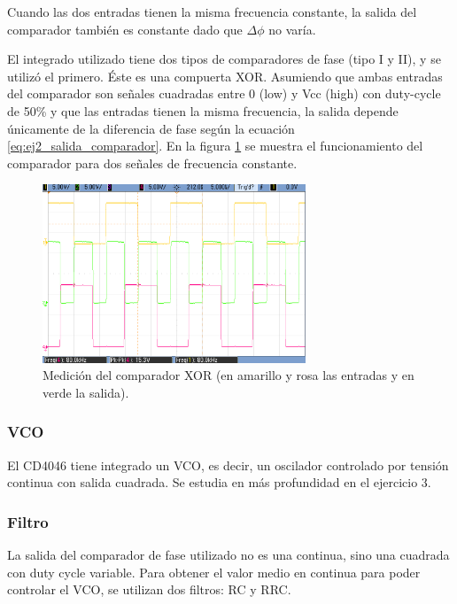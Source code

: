 \documentclass[../../tc_tp6_main.tex]{subfiles}
\begin{document}
Cuando las dos entradas tienen la misma frecuencia constante, la salida del comparador tambi\'en es constante dado que $\Delta \phi$ no var\'ia. 

El integrado utilizado tiene dos tipos de comparadores de fase (tipo I y II), y se utiliz\'o el primero. \'Este es una compuerta XOR. Asumiendo que ambas entradas del comparador son se\~nales cuadradas entre 0 (low) y Vcc (high) con duty-cycle de 50\% y que las entradas tienen la misma frecuencia, la salida depende \'unicamente de la diferencia de fase seg\'un la ecuaci\'on \ref{eq:ej2_salida_comparador}. En la figura \ref{fig:ej2_xor_med} se muestra el funcionamiento del comparador para dos se\~nales de frecuencia constante.

\begin{figure}[H]
	\centering 
	\includegraphics[width = 0.7\textwidth]{figures/xor.png}
	\caption{Medici\'on del comparador XOR (en amarillo y rosa las entradas y en verde la salida).}
	\label{fig:ej2_xor_med}
\end{figure}



\subsubsection{VCO}
El CD4046 tiene integrado un VCO, es decir, un oscilador controlado por tensi\'on continua con salida cuadrada. Se estudia en m\'as profundidad en el ejercicio 3.

\subsubsection{Filtro} \label{ssec:ej2_filtro}
La salida del comparador de fase utilizado no es una continua, sino una cuadrada con duty cycle variable. Para obtener el valor medio en continua para poder controlar el VCO, se utilizan dos filtros: RC y RRC.
\end{document}
